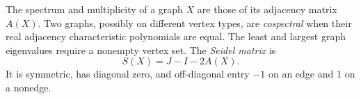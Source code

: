 \documentclass[11pt]{amsart}
\theoremstyle{definition}
\begin{document}
\begin{definition}\label{def:graph}
\mbox{}\par\nobreak
{}
The spectrum and multiplicity of a graph $X$ are those of its adjacency
matrix $A(X)$. Two graphs, possibly on different vertex types, are
\emph{cospectral} when their real adjacency characteristic polynomials
are equal. The least and largest graph eigenvalues require a nonempty
vertex set. The \emph{Seidel matrix} is
\[
 S(X)=J-I-2A(X).
\]
It is symmetric, has diagonal zero, and off-diagonal entry $-1$ on an
edge and $1$ on a nonedge.
\end{definition}
\end{document}

